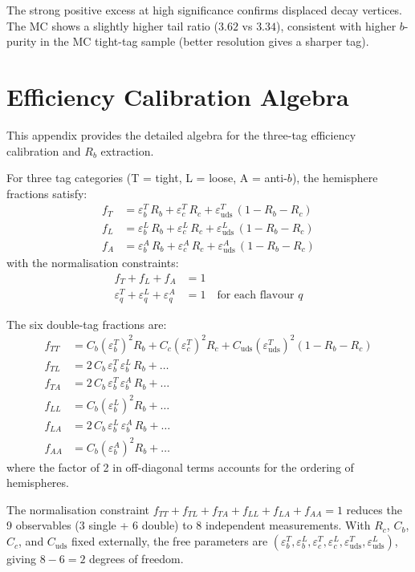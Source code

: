 \documentclass[11pt,a4paper]{article}
\begin{document}
The strong positive excess at high significance confirms
displaced decay vertices.
The MC shows a slightly higher tail ratio ($3.62$ vs $3.34$),
consistent with higher $b$-purity in the MC tight-tag sample
(better resolution gives a sharper tag).

\section{Efficiency Calibration Algebra}
\label{app:efficiency_algebra}

This appendix provides the detailed algebra for the three-tag
efficiency calibration and $R_b$ extraction.

For three tag categories (T = tight, L = loose, A = anti-$b$),
the hemisphere fractions satisfy:
\begin{align}
f_T &= \varepsilon_b^T\,R_b + \varepsilon_c^T\,R_c +
  \varepsilon_\text{uds}^T\,(1 - R_b - R_c) \\
f_L &= \varepsilon_b^L\,R_b + \varepsilon_c^L\,R_c +
  \varepsilon_\text{uds}^L\,(1 - R_b - R_c) \\
f_A &= \varepsilon_b^A\,R_b + \varepsilon_c^A\,R_c +
  \varepsilon_\text{uds}^A\,(1 - R_b - R_c)
\end{align}
with the normalisation constraints:
\begin{align}
f_T + f_L + f_A &= 1 \\
\varepsilon_q^T + \varepsilon_q^L + \varepsilon_q^A &= 1
  \quad \text{for each flavour } q
\end{align}

The six double-tag fractions are:
\begin{align}
f_{TT} &= C_b (\varepsilon_b^T)^2 R_b +
  C_c (\varepsilon_c^T)^2 R_c +
  C_\text{uds} (\varepsilon_\text{uds}^T)^2 (1 - R_b - R_c) \\
f_{TL} &= 2\,C_b\,\varepsilon_b^T\,\varepsilon_b^L\,R_b +
  \ldots \nonumber \\
f_{TA} &= 2\,C_b\,\varepsilon_b^T\,\varepsilon_b^A\,R_b +
  \ldots \nonumber \\
f_{LL} &= C_b (\varepsilon_b^L)^2 R_b + \ldots \nonumber \\
f_{LA} &= 2\,C_b\,\varepsilon_b^L\,\varepsilon_b^A\,R_b +
  \ldots \nonumber \\
f_{AA} &= C_b (\varepsilon_b^A)^2 R_b + \ldots
\end{align}
where the factor of 2 in off-diagonal terms accounts for the
ordering of hemispheres.

The normalisation constraint
$f_{TT} + f_{TL} + f_{TA} + f_{LL} + f_{LA} + f_{AA} = 1$
reduces the 9 observables ($3$ single + $6$ double) to 8
independent measurements.
With $R_c$, $C_b$, $C_c$, and $C_\text{uds}$ fixed externally,
the free parameters are
$(\varepsilon_b^T, \varepsilon_b^L, \varepsilon_c^T,
\varepsilon_c^L, \varepsilon_\text{uds}^T,
\varepsilon_\text{uds}^L)$, giving $8 - 6 = 2$ degrees of freedom.
\end{document}
